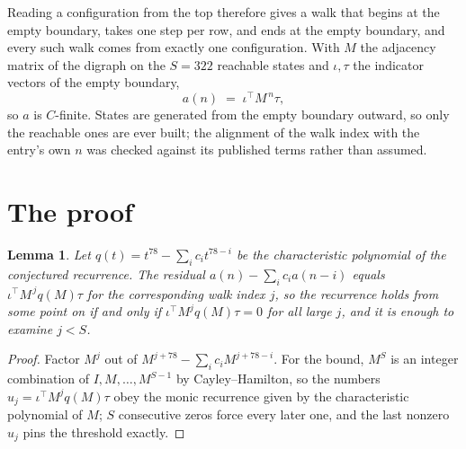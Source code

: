 \documentclass[11pt,a4paper]{article}
\theoremstyle{plain}
\newtheorem{lemma}[theorem]{Lemma}
\theoremstyle{definition}
\begin{document}
Reading a configuration from the top therefore gives a walk that begins at the empty boundary,
takes one step per row, and ends at the empty boundary, and every such walk comes from exactly
one configuration. With $M$ the adjacency matrix of the digraph on the $S=322$ reachable
states and $\iota,\tau$ the indicator vectors of the empty boundary,
\[
a(n)\;=\;\iota^{\!\top}M^{\,n}\tau ,
\]
so $a$ is $C$-finite. States are generated from the empty boundary outward, so only the
reachable ones are ever built; the alignment of the walk index with the entry's own $n$ was
checked against its published terms rather than assumed.

\section{The proof}

\begin{lemma}\label{lem:crit}
Let $q(t)=t^{78}-\sum_i c_it^{78-i}$ be the characteristic polynomial of the
conjectured recurrence. The residual $a(n)-\sum_ic_ia(n-i)$ equals
$\iota^{\!\top}M^{\,j}q(M)\tau$ for the corresponding walk index $j$, so the recurrence
holds from some point on if and only if $\iota^{\!\top}M^{j}q(M)\tau=0$ for all large $j$,
and it is enough to examine $j<S$.
\end{lemma}

\begin{proof}
Factor $M^{j}$ out of $M^{j+78}-\sum_ic_iM^{j+78-i}$. For the bound, $M^{S}$
is an integer combination of $I,M,\dots,M^{S-1}$ by Cayley--Hamilton, so the numbers
$u_j=\iota^{\!\top}M^{j}q(M)\tau$ obey the monic recurrence given by the characteristic
polynomial of $M$; $S$ consecutive zeros force every later one, and the last nonzero $u_j$
pins the threshold exactly.
\end{proof}
\end{document}
